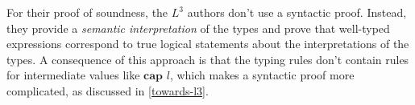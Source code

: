 \documentclass[]{unswthesis}
\newcommand{\ptr}[1]{\textbf{ptr $#1$}}
\newcommand{\capa}[1]{\textbf{cap $#1$}}
\newcommand{\lquine}{\left\ulcorner}
\newcommand{\rquine}{\right\urcorner}
\let\c\texttt
\let\i\textit
\begin{document}
For their proof of soundness, the $L^3$ authors don't use a syntactic proof. Instead, they provide a \i{semantic interpretation} of the types and prove that well-typed expressions correspond to true logical statements about the interpretations of the types. A consequence of this approach is that the typing rules don't contain rules for intermediate values like $\capa{l}$, which makes a syntactic proof more complicated, as discussed in \cref{towards-l3}.

\newpage





\end{document}
